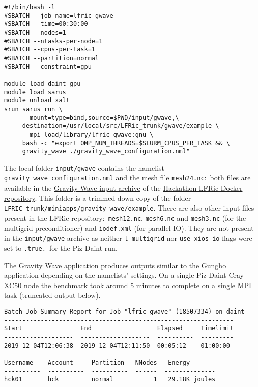 \documentclass[twoside,a4paper,12pt]{article}
\begin{document}
\begin{Verbatim}[fontsize=\small]
#!/bin/bash -l
#SBATCH --job-name=lfric-gwave
#SBATCH --time=00:30:00
#SBATCH --nodes=1
#SBATCH --ntasks-per-node=1
#SBATCH --cpus-per-task=1
#SBATCH --partition=normal
#SBATCH --constraint=gpu

module load daint-gpu
module load sarus
module unload xalt
srun sarus run \
     --mount=type=bind,source=$PWD/input/gwave,\
     destination=/usr/local/src/LFRic_trunk/gwave/example \
     --mpi load/library/lfric-gwave:gnu \
     bash -c "export OMP_NUM_THREADS=$SLURM_CPUS_PER_TASK && \
     gravity_wave ./gravity_wave_configuration.nml"
 \end{Verbatim}

The local folder \texttt{input/gwave} contains the namelist
\texttt{gravity\_wave\_configuration.nml} and the mesh file \texttt{mesh24.nc}:\
both files are available in the
\href{https://github.com/eth-cscs/ContainerHackathon/blob/master/LFRIC/docker/input-gwave.tar.gz}
{Gravity Wave input archive} of the
\href{https://github.com/eth-cscs/ContainerHackathon/tree/master/LFRIC/docker}
{Hackathon LFRic Docker repository}.
This folder is a trimmed-down copy of the folder
\texttt{LFRIC\_trunk/miniapps/gravity\_wave/example}. There are also other input
files present in the LFRic repository:\ \texttt{mesh12.nc}, \texttt{mesh6.nc} and
\texttt{mesh3.nc} (for the multigrid preconditioner) and \texttt{iodef.xml}
(for parallel IO). They are not present in the \texttt{input/gwave} archive as
neither \texttt{l\_multigrid} nor \texttt{use\_xios\_io} flags were set to
\texttt{.true.}\ for the Piz Daint run.

The Gravity Wave application produces outputs similar to the Gungho application
depending on the namelists' settings. On a single Piz Daint Cray XC50 node the
benchmark took around 5 minutes to complete on a single MPI task (truncated
output below).

\begin{Verbatim}[fontsize=\small]
Batch Job Summary Report for Job "lfric-gwave" (18507334) on daint
---------------------------------------------------------------
Start                End                  Elapsed     Timelimit
-------------------  -------------------  ----------  ---------
2019-12-04T12:06:38  2019-12-04T12:11:50  00:05:12    01:00:00
---------------------------------------------------------------
Username    Account     Partition   NNodes   Energy
----------  ----------  ----------  ------  --------------
hck01       hck         normal           1   29.18K joules
\end{Verbatim}
\end{document}
